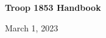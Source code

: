 \documentclass{ltxguide}
\begin{document}
\begin{titlepage}
    \centering
    \vfill
    {\bfseries\Huge
        Troop 1853 Handbook\\
    }    
    \vfill
	\begin{figure}
	\hfill
    \vfill
	\end{figure}
	March 1, 2023
\end{titlepage}
\newpage
\end{document}
